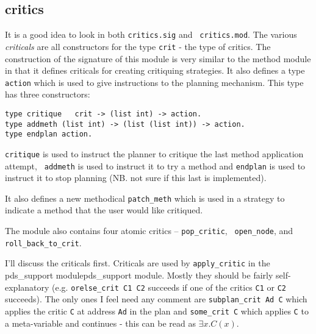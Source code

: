 \subsection{critics}
It is a good idea to look in both {\tt critics.sig} and {\tt
  critics.mod}.  The various {\em criticals} are all
constructors for the type {\tt crit} - the type of
critics.  The construction of the signature of this module is very
similar to the method module in that it defines
criticals for creating critiquing strategies.  It
also defines a type {\tt action} which is used to
give instructions to the planning mechanism.  This type has three
constructors:

\begin{verbatim}
type critique   crit -> (list int) -> action.
type addmeth (list int) -> (list (list int)) -> action.
type endplan action.
\end{verbatim}

{\tt critique} is used to instruct the planner to
critique the last method application attempt, {\tt
addmeth} is used to instruct it to try a method and
{\tt endplan} is used to instruct it to stop planning
(NB. not sure if this last is implemented).

It also defines a new methodical {\tt patch\_meth}
which is used in a strategy to indicate a method that the user would
like critiqued.

The module also contains four atomic critics --
{\tt pop\_critic}, {\tt
  open\_node},
 and {\tt
  roll\_back\_to\_crit}. 

I'll discuss the criticals first.  Criticals are used 
by {\tt apply\_critic} in the pds\_support
module{\index pds\_support module}.  Mostly they should be fairly
self-explanatory (e.g. {\tt orelse\_crit C1 C2}
succeeds if one of the critics {\tt C1} or {\tt C2} succeeds).  The
only ones I feel need any comment are {\tt subplan\_crit Ad
  C} which applies the critic {\tt C} at address
{\tt Ad} in the plan and {\tt some\_crit C} which
applies {\tt C} to a meta-variable and continues - this can be read as 
$\exists x. C(x)$.


